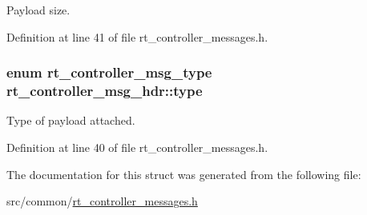 Payload size. 



Definition at line 41 of file rt\-\_\-controller\-\_\-messages.\-h.

\hypertarget{structrt__controller__msg__hdr_aeaaded0407c30884b04405eae9ecc9f3}{
\subsubsection[{type}]{\setlength{\rightskip}{0pt plus 5cm}enum {\bf rt\-\_\-controller\-\_\-msg\-\_\-type} rt\-\_\-controller\-\_\-msg\-\_\-hdr\-::type}}\label{structrt__controller__msg__hdr_aeaaded0407c30884b04405eae9ecc9f3}


Type of payload attached. 



Definition at line 40 of file rt\-\_\-controller\-\_\-messages.\-h.



The documentation for this struct was generated from the following file\-:\begin{DoxyCompactItemize}
\item 
src/common/\hyperlink{rt__controller__messages_8h}{rt\-\_\-controller\-\_\-messages.\-h}\end{DoxyCompactItemize}
